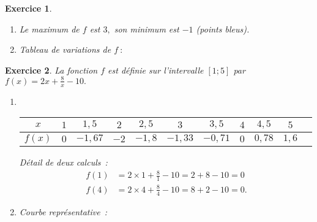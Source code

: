 \documentclass[10pt]{article}
\newtheorem{exo}{Exercice}
\begin{document}
\begin{exo}
\begin{enumerate}
\item Le maximum de $f$ est $3,$ son minimum est $-1$ (points bleus).
\item Tableau de variations de $f~:$

\begin{center}
\end{center}
\end{enumerate}

\end{exo}



\begin{exo}

La fonction $f$ est définie sur l'intervalle $\left[1;5\right]$ par $f\left(x\right)=2x+\frac{8}{x}-10.$

\begin{enumerate}
\item ~{}

\begin{center}

\begin{tabular}{|c|c|c|c|c|c|c|c|c|c|c|}\hline
$x$& $1$ &$1,5$ &$2$ &$2,5$ &$3$ &$3,5$ &$4$ &$4,5$ &$5$ \\ \hline 
$f(x)$&$0$ &$-1,67$ &$-2$   &$-1,8$  &$-1,33$  &$-0,71$  &$0$  &$0,78$  &$1,6$    \\ \hline
\end{tabular}

\end{center}

\medskip

Détail de deux calculs~:
\begin{align*}
f(1)&=2\times 1+\frac{8}{1}-10=2+8-10=0\\
f(4)&=2\times 4+\frac{8}{4}-10=8+2-10=0.
\end{align*}


\item Courbe représentative~:


\end{enumerate}
\end{exo}
\end{document}

